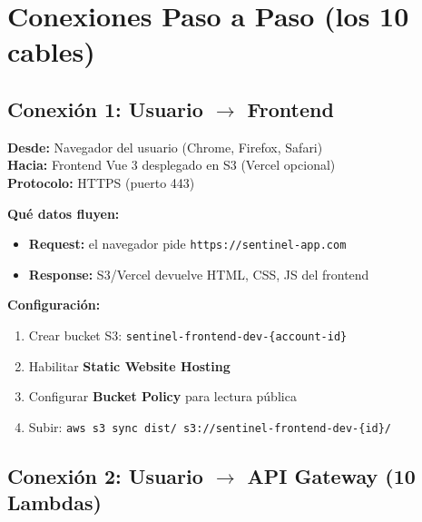 \documentclass[11pt,a4paper]{article}
\begin{document}
\section{Conexiones Paso a Paso (los 10 cables)}

\newpage
\subsection{Conexi\'on 1: Usuario $\rightarrow$ Frontend}

\begin{tcolorbox}[colback=blue!5, colframe=clientblue, title=\textbf{Desde $\rightarrow$ Hasta}]
\textbf{Desde:} Navegador del usuario (Chrome, Firefox, Safari) \\
\textbf{Hacia:} Frontend Vue 3 desplegado en S3 (Vercel opcional) \\
\textbf{Protocolo:} HTTPS (puerto 443)
\end{tcolorbox}

\begin{center}
\end{center}

\textbf{Qu\'e datos fluyen:}
\begin{itemize}[leftmargin=*]
  \item \textbf{Request:} el navegador pide \texttt{https://sentinel-app.com}
  \item \textbf{Response:} S3/Vercel devuelve HTML, CSS, JS del frontend
\end{itemize}

\textbf{Configuraci\'on:}
\begin{enumerate}[leftmargin=*]
  \item Crear bucket S3: \texttt{sentinel-frontend-dev-\{account-id\}}
  \item Habilitar \textbf{Static Website Hosting}
  \item Configurar \textbf{Bucket Policy} para lectura p\'ublica
  \item Subir: \texttt{aws s3 sync dist/ s3://sentinel-frontend-dev-\{id\}/}
\end{enumerate}

\subsection{Conexi\'on 2: Usuario $\rightarrow$ API Gateway (10 Lambdas)}
\end{document}
